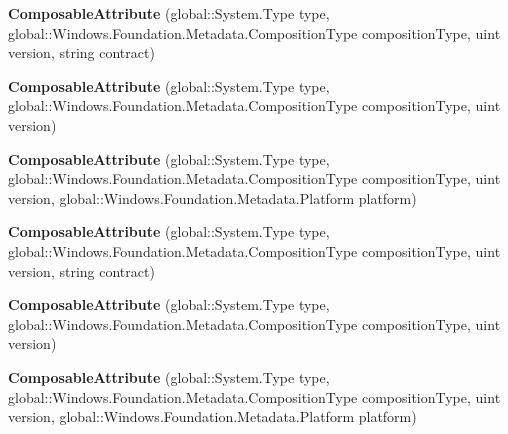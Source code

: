 \begin{DoxyCompactItemize}
\item 
\mbox{\label{class_windows_1_1_foundation_1_1_metadata_1_1_composable_attribute_af1f14e4b9b6a4de568817fdeb25c51b5}} 
{\bfseries Composable\+Attribute} (global\+::\+System.\+Type type, global\+::\+Windows.\+Foundation.\+Metadata.\+Composition\+Type composition\+Type, uint version, string contract)
\item 
\mbox{\label{class_windows_1_1_foundation_1_1_metadata_1_1_composable_attribute_a9698d1ccfc15873da70639d7c273f978}} 
{\bfseries Composable\+Attribute} (global\+::\+System.\+Type type, global\+::\+Windows.\+Foundation.\+Metadata.\+Composition\+Type composition\+Type, uint version)
\item 
\mbox{\label{class_windows_1_1_foundation_1_1_metadata_1_1_composable_attribute_ac7f7df8b8f0df32c124854576b18bd79}} 
{\bfseries Composable\+Attribute} (global\+::\+System.\+Type type, global\+::\+Windows.\+Foundation.\+Metadata.\+Composition\+Type composition\+Type, uint version, global\+::\+Windows.\+Foundation.\+Metadata.\+Platform platform)
\item 
\mbox{\label{class_windows_1_1_foundation_1_1_metadata_1_1_composable_attribute_af1f14e4b9b6a4de568817fdeb25c51b5}} 
{\bfseries Composable\+Attribute} (global\+::\+System.\+Type type, global\+::\+Windows.\+Foundation.\+Metadata.\+Composition\+Type composition\+Type, uint version, string contract)
\item 
\mbox{\label{class_windows_1_1_foundation_1_1_metadata_1_1_composable_attribute_a9698d1ccfc15873da70639d7c273f978}} 
{\bfseries Composable\+Attribute} (global\+::\+System.\+Type type, global\+::\+Windows.\+Foundation.\+Metadata.\+Composition\+Type composition\+Type, uint version)
\item 
\mbox{\label{class_windows_1_1_foundation_1_1_metadata_1_1_composable_attribute_ac7f7df8b8f0df32c124854576b18bd79}} 
{\bfseries Composable\+Attribute} (global\+::\+System.\+Type type, global\+::\+Windows.\+Foundation.\+Metadata.\+Composition\+Type composition\+Type, uint version, global\+::\+Windows.\+Foundation.\+Metadata.\+Platform platform)

\end{DoxyCompactItemize}
